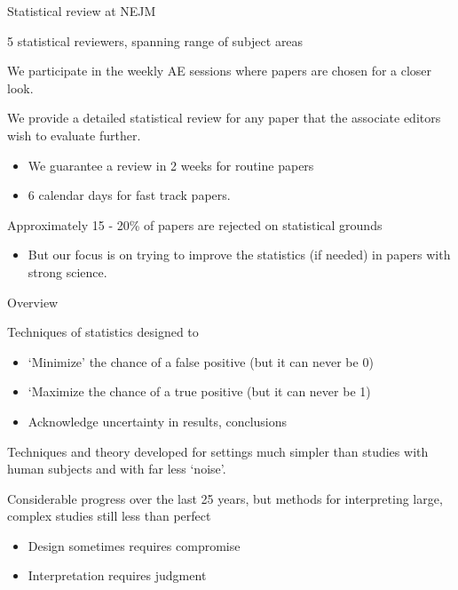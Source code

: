 \documentclass[ignorenonframetext,]{beamer}
\begin{document}
\begin{frame}{Statistical review at NEJM}

5 statistical reviewers, spanning range of subject areas \medskip  

We participate in the weekly AE sessions where papers are chosen for a
closer look.\medskip

We provide a detailed statistical review for any paper that the
associate editors wish to evaluate further.

\begin{itemize}
\item
  We guarantee a review in 2 weeks for routine papers
\item
  6 calendar days for fast track papers.
\end{itemize}

Approximately 15 - 20\% of papers are rejected on statistical grounds

\begin{itemize}
\itemsep1pt\parskip0pt
\item
  But our focus is on trying to improve the statistics (if needed) in
  papers with strong science.
\end{itemize}

\end{frame}

\begin{frame}{Overview}

Techniques of statistics designed to

\begin{itemize}
\item
  `Minimize' the chance of a false positive (but it can never be 0)
\item
  `Maximize the chance of a true positive (but it can never be 1)
\item
  Acknowledge uncertainty in results, conclusions
\end{itemize}

Techniques and theory developed for settings much simpler than studies
with human subjects and with far less `noise'. \medskip

Considerable progress over the last 25 years, but methods for
interpreting large, complex studies still less than perfect

\begin{itemize}
\item
  Design sometimes requires compromise
\item
  Interpretation requires judgment
\end{itemize}

\end{frame}
\end{document}
